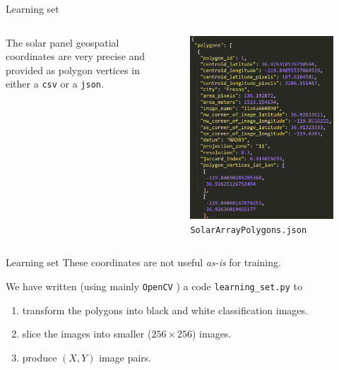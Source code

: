 \documentclass[12pt]{beamer}
\begin{document}
\begin{frame}{Learning set}
    \begin{columns}
        The solar panel geospatial coordinates are very precise and provided as \alert{polygon vertices} in either a \alert{\texttt{csv}} or a \alert{\texttt{json}}.
        \begin{figure}
            \centering
            \includegraphics[height=0.8\textheight]{./resources/png/coordinates.png}
            \caption{\texttt{SolarArrayPolygons.json}}
        \end{figure}
    \end{columns}
\end{frame}

\begin{frame}{Learning set}
    These coordinates are not useful \emph{as-is} for training.
    
    We have written (using mainly \alert{\texttt{OpenCV}} \cite{opencv}) a code \texttt{learning\_set.py} to
    \begin{enumerate}
        \item transform the polygons into black and white \alert{classification} images. 
        \item slice the images into smaller ($256 \times 256$) images.
        \item produce $(X, Y)$ image pairs.
    \end{enumerate}
\end{frame}
\end{document}
